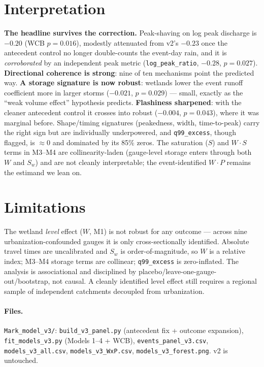 \documentclass[11pt]{article}
\begin{document}
\section{Interpretation}
\textbf{The headline survives the correction.} Peak-shaving on log peak discharge is
$-0.20$ (WCB $p=0.016$), modestly attenuated from v2's $-0.23$ once the antecedent control no
longer double-counts the event-day rain, and it is \emph{corroborated} by an independent peak
metric (\texttt{log\_peak\_ratio}, $-0.28$, $p=0.027$). \textbf{Directional coherence is strong}:
nine of ten mechanisms point the predicted way. \textbf{A storage signature is now robust}:
wetlands lower the event runoff coefficient more in larger storms ($-0.021$, $p=0.029$) --- small,
exactly as the ``weak volume effect'' hypothesis predicts. \textbf{Flashiness sharpened}: with the
cleaner antecedent control it crosses into robust ($-0.004$, $p=0.043$), where it was marginal
before. Shape/timing signatures (peakedness, width, time-to-peak) carry the right sign but are
individually underpowered, and \texttt{q99\_excess}, though flagged, is $\approx0$ and dominated by
its 85\% zeros. The saturation ($S$) and $W\!\cdot\!S$ terms in M3--M4 are collinearity-laden
(gauge-level storage enters through both $W$ and $S_w$) and are not cleanly interpretable; the
event-identified $W\!\cdot\!P$ remains the estimand we lean on.

\section{Limitations}
The wetland \emph{level} effect ($W$, M1) is not robust for any outcome --- across nine
urbanization-confounded gauges it is only cross-sectionally identified. Absolute travel times are
uncalibrated and $S_w$ is order-of-magnitude, so $W$ is a relative index; M3--M4 storage terms are
collinear; \texttt{q99\_excess} is zero-inflated. The analysis is associational and disciplined by
placebo/leave-one-gauge-out/bootstrap, not causal. A cleanly identified level effect still requires
a regional sample of independent catchments decoupled from urbanization.

\paragraph{Files.} \texttt{Mark\_model\_v3/}: \texttt{build\_v3\_panel.py} (antecedent fix +
outcome expansion), \texttt{fit\_models\_v3.py} (Models 1--4 + WCB), \texttt{events\_panel\_v3.csv},
\texttt{models\_v3\_all.csv}, \texttt{models\_v3\_WxP.csv}, \texttt{models\_v3\_forest.png}. v2 is
untouched.
\end{document}
